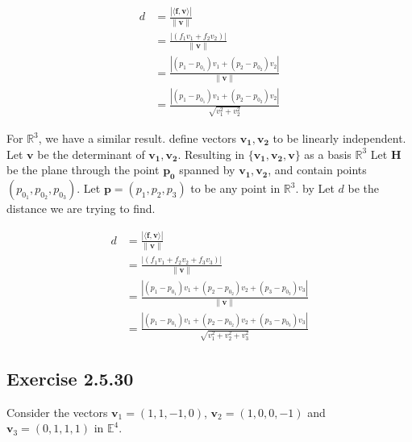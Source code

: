 \documentclass{tufte-book}
\newcommand{\vct}{\mathbf}
\newcommand{\dprod}[2]{\langle #1, #2 \rangle}
\theoremstyle{mytheoremstyle}
\theoremstyle{mylemstyle}
\theoremstyle{mydefstyle}
\begin{document}
\begin{align*}
d &= \frac{|\dprod{\vct{f}}{\vct{v}}|}{\|\vct{v}\|} \\
&= \frac{|(f_1v_1 + f_2v_2)|}{\|\vct{v}\|} \\
&= \frac{|(p_1 - p_{0_1})v_1 + (p_2-p_{0_2})v_2|}{\|\vct{v}\|}\\
&= \frac{|(p_1 - p_{0_1})v_1 + (p_2-p_{0_2})v_2|}{\sqrt{v_1^2 + v_2^2}}
\end{align*}

For $\mathbb{R}^3$, we have a similar result. define vectors $\vct{v_1},\vct{v_2}$  to be linearly independent.  Let $\vct{v}$ be the determinant of $\vct{v_1},\vct{v_2}$.  Resulting in $\{\vct{v_1},\vct{v_2},\vct{v}\}$ as a basis $\mathbb{R}^3$ Let $\mathbf{H}$ be the plane through the point $\vct{p_0}$  spanned by $\vct{v_1},\vct{v_2}$, and contain points $(p_{0_1}, p_{0_2},p_{0_3})$. Let $\vct{p} = (p_1, p_2, p_3)$ to be any point in $\mathbb{R}^3$.  by Let $d$ be the distance we are trying to find.

\begin{align*}
d &= \frac{|\dprod{\vct{f}}{\vct{v}}|}{\|\vct{v}\|} \\
&= \frac{|(f_1v_1 + f_2v_2 + f_3v_3 )|}{\|\vct{v}\|} \\
&= \frac{|(p_1 - p_{0_1})v_1 + (p_2-p_{0_2})v_2 + (p_3-p_{0_3})v_3|}{\|\vct{v}\|}\\
&= \frac{|(p_1 - p_{0_1})v_1 + (p_2-p_{0_2})v_2+ (p_3-p_{0_3})v_3|}{\sqrt{v_1^2 + v_2^2 + v_3^2}}
\end{align*}

\subsection{Exercise 2.5.30}
Consider the vectors $\vct{v}_1 = (1,1,-1,0)$, $\vct{v}_2=(1,0,0,-1)$ and $\vct{v}_3=(0,1,1,1)$ in $\mathbb{E}^4$.
\end{document}
